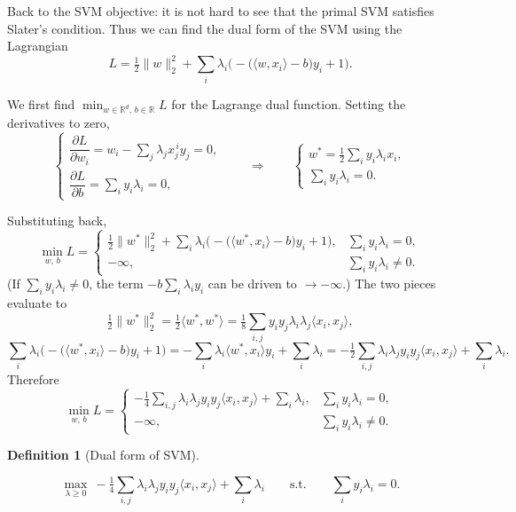 \documentclass[
  letterpaper,
  DIV=11,
  numbers=noendperiod]{scrreprt}
\theoremstyle{definition}
\newtheorem{definition}{Definition}[chapter]
\theoremstyle{plain}
\theoremstyle{plain}
\theoremstyle{definition}
\theoremstyle{plain}
\theoremstyle{plain}
\theoremstyle{remark}
\begin{document}
Back to the SVM objective: it is not hard to see that the primal SVM
satisfies Slater's condition. Thus we can find the dual form of the SVM
using the Lagrangian \[
L = \tfrac12 \|w\|_2^2 + \sum_i \lambda_i\Big(-\big(\langle w, x_i\rangle - b\big) y_i + 1\Big) .
\]

We first find \(\min_{w \in \mathbb{R}^d,\, b \in \mathbb{R}} L\) for
the Lagrange dual function. Setting the derivatives to zero, \[
\begin{cases}
\dfrac{\partial L}{\partial w_i} = w_i - \displaystyle\sum_j \lambda_j x_j^{\,i} y_j = 0, \\[2mm]
\dfrac{\partial L}{\partial b} = \displaystyle\sum_i y_i \lambda_i = 0,
\end{cases}
\qquad\Longrightarrow\qquad
\begin{cases}
w^\ast = \tfrac12 \displaystyle\sum_i y_i \lambda_i x_i, \\[2mm]
\displaystyle\sum_i y_i \lambda_i = 0 .
\end{cases}
\]

Substituting back, \[
\min_{w,\,b} L =
\begin{cases}
\tfrac12 \|w^\ast\|_2^2 + \displaystyle\sum_i \lambda_i\Big(-\big(\langle w^\ast, x_i\rangle - b\big) y_i + 1\Big), & \sum_i y_i \lambda_i = 0, \\
-\infty, & \sum_i y_i \lambda_i \ne 0 .
\end{cases}
\] (If \(\sum_i y_i \lambda_i \ne 0\), the term
\(-b \sum_i \lambda_i y_i\) can be driven to \(\to -\infty\).) The two
pieces evaluate to \[
\tfrac12 \|w^\ast\|_2^2 = \tfrac12 \langle w^\ast, w^\ast\rangle
= \tfrac18 \sum_{i,j} y_i y_j \lambda_i \lambda_j \langle x_i, x_j\rangle,
\] \[
\sum_i \lambda_i\Big(-\big(\langle w^\ast, x_i\rangle - b\big) y_i + 1\Big)
= -\sum_i \lambda_i \langle w^\ast, x_i\rangle y_i + \sum_i \lambda_i
= -\tfrac12 \sum_{i,j} \lambda_i \lambda_j y_i y_j \langle x_i, x_j\rangle + \sum_i \lambda_i .
\] Therefore \[
\min_{w,\,b} L =
\begin{cases}
-\tfrac14 \displaystyle\sum_{i,j} \lambda_i \lambda_j y_i y_j \langle x_i, x_j\rangle + \sum_i \lambda_i, & \sum_i y_i \lambda_i = 0, \\
-\infty, & \sum_i y_i \lambda_i \ne 0 .
\end{cases}
\]

\begin{definition}[Dual form of
SVM]\protect\hypertarget{def-svm-dual}{}\label{def-svm-dual}

\[
\max_{\lambda \ge 0} \ -\tfrac14 \sum_{i,j} \lambda_i \lambda_j y_i y_j \langle x_i, x_j\rangle + \sum_i \lambda_i
\qquad\text{s.t.}\qquad
\sum_i y_i \lambda_i = 0 .
\]

\end{definition}
\end{document}
